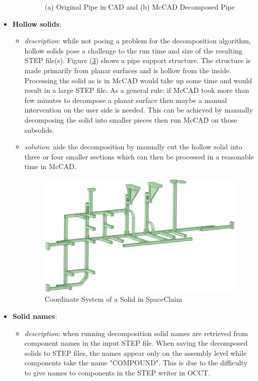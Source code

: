 \documentclass[12pt, a4paper, titlepage]{article}
\begin{document}
\begin{itemize}
\begin{itemize}
\begin{figure}[h!]
\begin{subfigure}{.5\textwidth}
				\caption{}
				\label{fig:b}
			\end{subfigure}
			\caption{(a) Original Pipe in CAD and (b) McCAD Decomposed Pipe}
			\label{fig:McCAD Decomposed Pipe}
		\end{figure}
	\end{itemize}
	\item \textbf{Hollow solids}:
	\begin{itemize}
		\item \emph{description}: while not posing a problem for the decomposition algorithm, hollow solids pose a challenge to the run time and size of the resulting STEP file(s). Figure (\ref{fig:Hollow Solid}) shows a pipe support structure. The structure is made primarily from planar surfaces and is hollow from the inside. Processing the solid as is in McCAD would take up some time and would result in a large STEP file. As a general rule: if McCAD took more than few minutes to decompose a planar surface then maybe a manual intervention on the user side is needed. This can be achieved by manually decomposing the solid into smaller pieces then run McCAD on those subsolids.
		\item \emph{solution}: aide the decomposition by manually cut the hollow solid into three or four smaller sections which can then be processed in a reasonable time in McCAD.  
		\begin{figure}[h!]
			\centering
			\includegraphics[scale=0.35]{figures/issues_Hollow.png}
			\caption{Coordinate System of a Solid in SpaceClaim}
			\label{fig:Hollow Solid}
		\end{figure}
	\end{itemize}
    \item \textbf{Solid names}:
    \begin{itemize}
    	\item \emph{description}: when running decomposition solid names are retrieved from component names in the input STEP file. When saving the decomposed solids to STEP files, the names appear only on the assembly level while components take the name "COMPOUND". This is due to the difficulty to give names to components in the STEP writer in OCCT.

\end{itemize}
\end{itemize}
\end{document}
